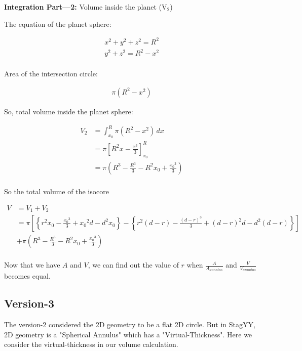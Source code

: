 \documentclass[12pt]{extarticle}
\begin{document}
\textbf{Integration Part---2:} Volume inside the planet (V$_2$)

The equation of the planet sphere:

    \begin{align*} 
        x^2 + y^2 + z^2 = R^2 \\
        y^2 + z^2 = R^2 - x^2 \\
    \end{align*}

Area of the intersection circle:

    \begin{align*} 
        \pi (R^2 - x^2)
    \end{align*}

So, total volume inside the planet sphere:

    \begin{align*} 
       V_2 &= \int_{x_0}^{R} \pi (R^2 - x^2) \,dx  \\
       &= \pi \left[  R^2 x - \frac{x^3}{3}  \right]_{x_0}^R \\
       &= \pi (R^3 - \frac{R^3}{3} - R^2 x_0 + \frac{{x_0}^3}{3}) \\
    \end{align*}

So the total volume of the isocore

    \begin{align*} 
       V &= V_1 + V_2 \\
       &= \pi \left[ \left\{ r^2 x_0 - \frac{{x_0}^3}{3} + {x_0}^2d -d^2x_0 \right\} -   \left\{ r^2 (d-r) - \frac{(d-r)^3}{3} + (d-r)^2 d - d^2 (d-r) \right\}   \right] \\
       &+ \pi (R^3 - \frac{R^3}{3} - R^2 x_0 + \frac{{x_0}^3}{3}) \\
    \end{align*}






Now that we have $A$ and $V$, we can find out the value of $r$ when $\frac{A}{A_{annulus}}$ and $\frac{V}{V_{annulus}}$ becomes equal.

\clearpage

\subsection{Version-3}

The version-2 considered the 2D geometry to be a flat 2D circle. But in StagYY, 2D geometry is a "Spherical Annulus" which has a "Virtual-Thickness". Here we consider the virtual-thickness in our volume calculation.
\end{document}
